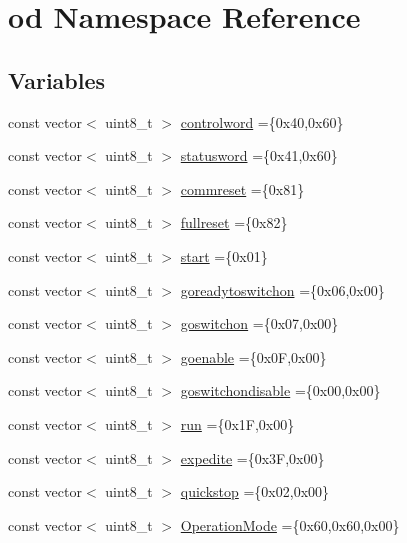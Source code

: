 \hypertarget{namespaceod}{}\section{od Namespace Reference}
\label{namespaceod}
\subsection*{Variables}
\begin{DoxyCompactItemize}
\item 
const vector$<$ uint8\+\_\+t $>$ \hyperlink{namespaceod_acb23d3cf4cdb0ce0c85a884a5a97ac00}{controlword} =\{0x40,0x60\}
\item 
const vector$<$ uint8\+\_\+t $>$ \hyperlink{namespaceod_a7fe65fca00afb38d66fb49ec4fdc88c0}{statusword} =\{0x41,0x60\}
\item 
const vector$<$ uint8\+\_\+t $>$ \hyperlink{namespaceod_a75b2ed7fb6e21d4335334e1525fd223c}{commreset} =\{0x81\}
\item 
const vector$<$ uint8\+\_\+t $>$ \hyperlink{namespaceod_af9d6d0e820d6bc1ee375195e253f7b7b}{fullreset} =\{0x82\}
\item 
const vector$<$ uint8\+\_\+t $>$ \hyperlink{namespaceod_a5ca62a6451017dd2a0d53391d6fc5161}{start} =\{0x01\}
\item 
const vector$<$ uint8\+\_\+t $>$ \hyperlink{namespaceod_a360cf2eae7cc59f7bd224fcf5992c767}{goreadytoswitchon} =\{0x06,0x00\}
\item 
const vector$<$ uint8\+\_\+t $>$ \hyperlink{namespaceod_a933f995790a17f6cdd3b54df8f7483a6}{goswitchon} =\{0x07,0x00\}
\item 
const vector$<$ uint8\+\_\+t $>$ \hyperlink{namespaceod_a74448ee88df5960df4c32613e7cdcd53}{goenable} =\{0x0\+F,0x00\}
\item 
const vector$<$ uint8\+\_\+t $>$ \hyperlink{namespaceod_a12f3001ff096334fecb9c9749be4d1c2}{goswitchondisable} =\{0x00,0x00\}
\item 
const vector$<$ uint8\+\_\+t $>$ \hyperlink{namespaceod_af47128107b86d08e437f81d48d20b05a}{run} =\{0x1\+F,0x00\}
\item 
const vector$<$ uint8\+\_\+t $>$ \hyperlink{namespaceod_ae572be966c7d5de90544f2ac32dbbd38}{expedite} =\{0x3\+F,0x00\}
\item 
const vector$<$ uint8\+\_\+t $>$ \hyperlink{namespaceod_a9afdc654634df7cc336d824c594d484a}{quickstop} =\{0x02,0x00\}
\item 
const vector$<$ uint8\+\_\+t $>$ \hyperlink{namespaceod_a6f4fb30463057c20b9374a69826f6143}{Operation\+Mode} =\{0x60,0x60,0x00\}

\end{DoxyCompactItemize}
